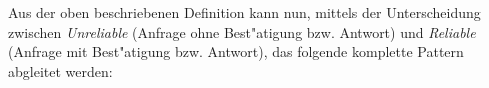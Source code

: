 \begin{figure}[!h]
\begin{center}
	\end{center}
\end{figure}




Aus der oben beschriebenen Definition kann nun, mittels der Unterscheidung zwischen {\it Unreliable} (Anfrage ohne Best"atigung bzw. Antwort) und {\it Reliable} (Anfrage mit Best"atigung bzw. Antwort), das folgende komplette Pattern abgleitet werden:


